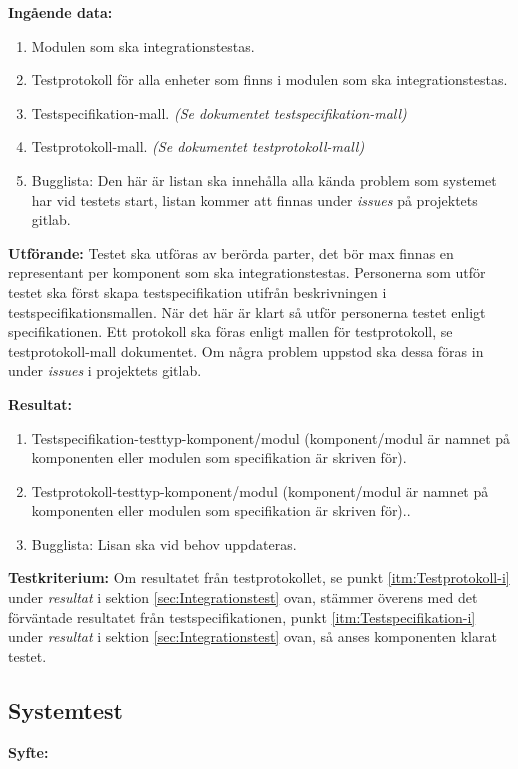 \documentclass[a4paper,10pt]{article}
\begin{document}
\textbf{Ingående data:}
    \begin{enumerate}
        \item Modulen som ska integrationstestas.
        \item Testprotokoll för alla enheter som finns i modulen som ska integrationstestas.
        \item Testspecifikation-mall. \emph{(Se dokumentet testspecifikation-mall)}
        \item Testprotokoll-mall. \emph{(Se dokumentet testprotokoll-mall)}
        \item Bugglista: Den här är listan ska innehålla alla kända problem som systemet har vid testets start, listan kommer att finnas under \emph{issues} på projektets gitlab.
    \end{enumerate}

\textbf{Utförande:} Testet ska utföras av berörda parter, det bör max finnas en representant per komponent som ska integrationstestas. Personerna som utför testet ska först skapa testspecifikation utifrån beskrivningen i testspecifikationsmallen. När det här är klart så utför personerna testet enligt specifikationen. Ett protokoll ska föras enligt mallen för testprotokoll, se testprotokoll-mall dokumentet. Om några problem uppstod ska dessa föras in under \emph{issues} i projektets gitlab.

\textbf{Resultat:}
    \begin{enumerate}
        \item \label{itm:Testspecifikation-i} Testspecifikation-testtyp-komponent/modul (komponent/modul är namnet på komponenten eller modulen som specifikation är skriven för).
        \item \label{itm:Testprotokoll-i} Testprotokoll-testtyp-komponent/modul (komponent/modul är namnet på komponenten eller modulen som specifikation är skriven för)..
        \item Bugglista: Lisan ska vid behov uppdateras.
    \end{enumerate}

\textbf{Testkriterium:} Om resultatet från testprotokollet, se punkt \ref{itm:Testprotokoll-i} under \emph{resultat} i sektion \ref{sec:Integrationstest} ovan, stämmer överens med det förväntade resultatet från testspecifikationen, punkt \ref{itm:Testspecifikation-i} under \emph{resultat} i sektion \ref{sec:Integrationstest} ovan, så anses komponenten klarat testet.

\subsection{Systemtest}
\label{sec:Systemtest}
\textbf{Syfte:}
\end{document}
